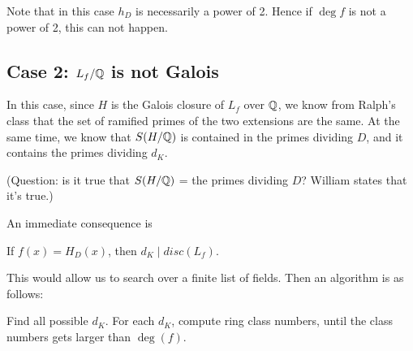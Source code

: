 \documentclass{article}
\begin{document}
Note that in this case $h_D$ is necessarily a power of 2. Hence if $\deg f$ is not a power of 2, this can not happen.


\subsection{Case 2: $L_f/\mathbb{Q}$ is not Galois}

In this case, since $H$ is the Galois closure of $L_f$ over $\mathbb{Q}$, we know from Ralph's class that the set of ramified primes of the two extensions are the same. At the same time, we know that
$S(H/\mathbb{Q})$ is contained in the primes dividing $D$, and it contains the primes dividing $d_K$.

(Question: is it true that $S(H/\mathbb{Q})$ = the primes dividing $D$? William states that it's true.)

An immediate consequence is
\begin{Lemma}
If $f(x) = H_D(x)$, then $d_K \mid disc(L_f)$.
\end{Lemma}

This would allow us to search over a finite list of fields. Then an algorithm is as follows:

Find all possible $d_K$. For each $d_K$, compute ring class numbers, until the class numbers gets larger than $\deg(f)$. 
\end{document}
